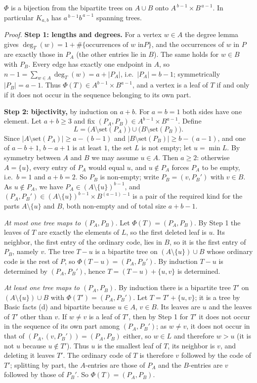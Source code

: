 \documentclass[11pt]{article}
\begin{document}
\begin{theorembox}
$\Phi$ is a bijection from the bipartite trees on $A\cup B$ onto
$A^{\,b-1}\times B^{\,a-1}$. In particular $K_{a,b}$ has
$a^{\,b-1}b^{\,a-1}$ spanning trees.

\emph{Proof.} \textbf{Step 1: lengths and degrees.} For a vertex $w\in A$
the degree lemma gives $\deg_T(w)=1+\#\{\text{occurrences of }w\text{ in
}P\}$, and the occurrences of $w$ in $P$ are exactly those in $P_A$ (the
other entries lie in $B$). The same holds for $w\in B$ with $P_B$. Every
edge has exactly one endpoint in $A$, so
$n-1=\sum_{w\in A}\deg_T(w)=a+|P_A|$, i.e.\ $|P_A|=b-1$; symmetrically
$|P_B|=a-1$. Thus $\Phi(T)\in A^{b-1}\times B^{a-1}$, and a vertex is a
leaf of $T$ if and only if it does not occur in the sequence belonging to
its own part.

\textbf{Step 2: bijectivity,} by induction on $a+b$. For $a=b=1$ both
sides have one element. Let $a+b\ge3$ and fix
$(P_A,P_B)\in A^{b-1}\times B^{a-1}$. Define
\[
  L=\bigl(A\setminus\mathrm{set}(P_A)\bigr)\cup\bigl(B\setminus\mathrm{set}(P_B)\bigr).
\]
Since $|A\setminus\mathrm{set}(P_A)|\ge a-(b-1)$ and
$|B\setminus\mathrm{set}(P_B)|\ge b-(a-1)$, and one of $a-b+1$, $b-a+1$ is
at least $1$, the set $L$ is not empty; let $u=\min L$. By symmetry between
$A$ and $B$ we may assume $u\in A$. Then $a\ge2$: otherwise $A=\{u\}$,
every entry of $P_A$ would equal $u$, and $u\notin P_A$ forces $P_A$ to be
empty, i.e.\ $b=1$ and $a+b=2$. So $P_B$ is non-empty; write
$P_B=(v,P_B')$ with $v\in B$. As $u\notin P_A$, we have
$P_A\in(A\setminus\{u\})^{b-1}$, and
$(P_A,P_B')\in(A\setminus\{u\})^{b-1}\times B^{(a-1)-1}$ is a pair of the
required kind for the parts $A\setminus\{u\}$ and $B$, both non-empty and
of total size $a+b-1$.

\emph{At most one tree maps to $(P_A,P_B)$.} Let $\Phi(T)=(P_A,P_B)$.
By Step 1 the leaves of $T$ are exactly the elements of $L$, so the first
deleted leaf is $u$. Its neighbor, the first entry of the ordinary code, lies in
$B$, so it is the first entry of $P_B$, namely $v$. The tree $T-u$ is a
bipartite tree on $(A\setminus\{u\})\cup B$ whose ordinary code is the
rest of $P$, so $\Phi(T-u)=(P_A,P_B')$. By induction $T-u$ is determined by
$(P_A,P_B')$, hence $T=(T-u)+\{u,v\}$ is determined.

\emph{At least one tree maps to $(P_A,P_B)$.} By induction there is a
bipartite tree $T'$ on $(A\setminus\{u\})\cup B$ with
$\Phi(T')=(P_A,P_B')$. Let $T=T'+\{u,v\}$; it is a tree by Basic facts (d)
and bipartite because $u\in A$, $v\in B$. Its leaves are $u$ and the leaves
of $T'$ other than $v$. If $w\ne v$ is a leaf of $T'$, then by Step 1 for
$T'$ it does not occur in the sequence of its own part among
$(P_A,P_B')$; as $w\ne v$, it does not occur in that of
$(P_A,(v,P_B'))=(P_A,P_B)$ either, so $w\in L$ and therefore $w>u$ (it is
not $u$ because $u\notin T'$). Thus $u$ is the smallest leaf of $T$, its
neighbor is $v$, and deleting it leaves $T'$. The ordinary code of $T$ is
therefore $v$ followed by the code of $T'$; splitting by part, the
$A$-entries are those of $P_A$ and the $B$-entries are $v$ followed by
those of $P_B'$. So $\Phi(T)=(P_A,P_B)$.


\end{theorembox}
\end{document}
